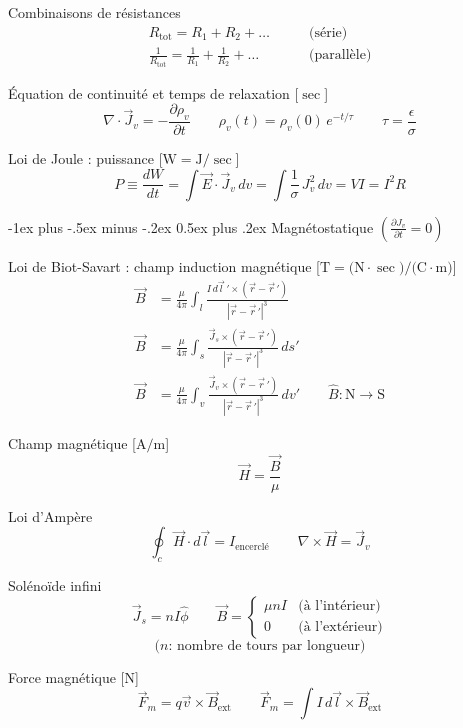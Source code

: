\documentclass[10pt,landscape]{article}
\makeatletter
\renewcommand{\section}{\@startsection{section}{1}{0mm}%
                                {-1ex plus -.5ex minus -.2ex}%
                                {0.5ex plus .2ex}%
                                {\normalfont\large\bfseries}}
\newcommand{\extraline}{\vspace{1em}}
\newcommand{\uvec}[1]{\ensuremath{{\hat{#1}}}}
\makeatother
\begin{document}
\begin{multicols}{3}
\extraline
Combinaisons de résistances
\begin{align*}
R_\text{tot} = R_1 + R_2 + \dots \qquad & \text{(série)} \\
\frac{1}{R_\text{tot}} = \frac{1}{R_1} + \frac{1}{R_2} + \dots \qquad & \text{(parallèle)}
\end{align*}

Équation de continuité et temps de relaxation [$\si{\sec}$]
\[ \nabla\cdot\vec{J}_v = -\frac{\partial\rho_v}{\partial t} 
\qquad
\rho_v(t) = \rho_v(0) \, e^{-t/\tau}
\qquad
\tau = \frac{\epsilon}{\sigma} \]

Loi de Joule : puissance [$\si{\watt} = \si{\joule}/\si{\sec}$]
\[ P 
\equiv \frac{dW}{dt}
= \int \vec{E}\cdot \vec{J}_v \,dv 
= \int \frac{1}{\sigma}\, J_v^2\,dv
= VI = I^2 R\]


\hrulefill
\section{Magnétostatique $\left(\frac{\partial J_v}{\partial t} = 0 \right)$}

Loi de Biot-Savart : champ induction magnétique [$\si{\tesla} = \si{(\newton\cdot\sec)/(\coulomb\cdot\metre)}$]
\begin{align*}
\vec{B} &= \frac{\mu}{4\pi} \int_l \frac{I\,d\vec{l}\,' \times(\vec{r}-\vec{r}\,')}{|\vec{r}-\vec{r}\,'|^3}  \\
\vec{B} &= \frac{\mu}{4\pi} \int_s \frac{\vec{J}_s \times(\vec{r}-\vec{r}\,')}{|\vec{r}-\vec{r}\,'|^3} \, ds' \\
\vec{B} &= \frac{\mu}{4\pi} \int_v \frac{\vec{J}_v \times(\vec{r}-\vec{r}\,')}{|\vec{r}-\vec{r}\,'|^3} \, dv'  \qquad
\uvec{B}: \text{N} \rightarrow \text{S}
\end{align*}

Champ magnétique [$\si{\ampere/\meter}$]
\[ \vec{H} = \frac{\vec{B}}{\mu} \]

Loi d'Ampère
\[ \oint_c \vec{H}\cdot d\vec{l} = I_\text{encerclé}
\qquad \nabla\times\vec{H} = \vec{J}_v   \]

Solénoïde infini
\[
\vec{J}_s = nI\uvec{\phi} \qquad 
\vec{B} = 
\begin{cases} 
	\mu n I  & \text{(à l'intérieur)} \\
	0 & \text{(à l'extérieur)}
\end{cases}\]
\[ \text{($n$: nombre de tours par longueur)} \]

\extraline
Force magnétique [\si{\newton}]
\[ \vec{F}_m = q\vec{v} \times \vec{B}_\text{ext} 
\qquad
\vec{F}_m = \int I\,d\vec{l} \times \vec{B}_\text{ext}  \]


\end{multicols}
\end{document}
